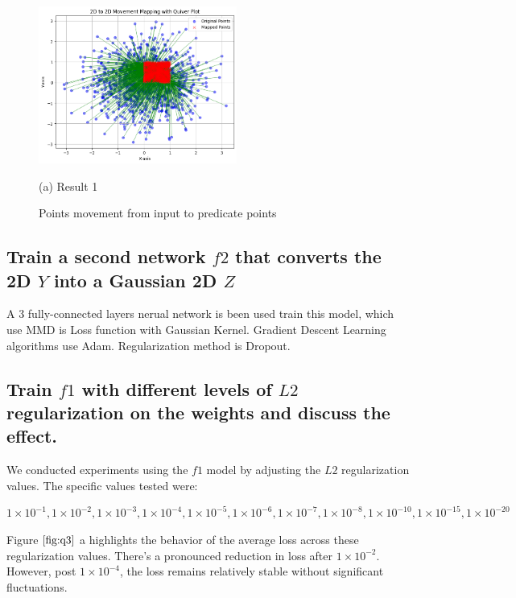 \documentclass{article}
\begin{document}
\begin{figure}[htb]

  \begin{minipage}[b]{1.0\linewidth}
    \centering
    \centerline{\includegraphics[width=6.5cm]{images/f1}}
    \centerline{(a) Result 1}\medskip
  \end{minipage}
  \caption{Points movement from input to predicate points}
  \label{fig:f1}
  \end{figure}

\subsection{Train a second network $f2$ that converts the 2D $Y$ into a Gaussian 2D $Z$}
\label{ssec:q2}

A 3 fully-connected layers nerual network is been used train this model, 
which use MMD is Loss function with Gaussian Kernel. 
Gradient Descent Learning algorithms use Adam.
Regularization method is Dropout.

\subsection{Train $f1$ with different levels of $L2$ regularization on the weights and
discuss the effect.}
\label{ssec:q3}

We conducted experiments using the $f1$ model by adjusting the $L2$ regularization values. 
The specific values tested were: 

$
1\times 10^{-1}, 1\times 10^{-2}, 
1\times 10^{-3}, 1\times 10^{-4}, 1\times 10^{-5}, 
1\times 10^{-6}, 1\times 10^{-7}, 1\times 10^{-8}, 
1\times 10^{-10}, 1\times 10^{-15}, 1\times 10^{-20} 
$ 

Figure $\ref{fig:q3}$ a highlights the behavior of 
the average loss across these regularization values. 
There's a pronounced reduction in loss after 
$1\times 10^{-2}$. However, post 
$1\times 10^{-4}$, the loss remains relatively stable without significant fluctuations.
\end{document}
